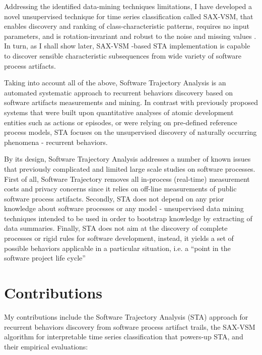 Addressing the identified data-mining techniques limitations, 
I have developed a novel unsupervised technique for time series classification called SAX-VSM, that enables 
discovery and ranking of class-characteristic patterns, requires no input parameters, and is rotation-invariant 
and robust to the noise and missing values \cite{sax-vsm}. 
In turn, as I shall show later, SAX-VSM -based STA implementation is capable to discover sensible characteristic 
subsequences from wide variety of software process artifacts.

Taking into account all of the above, Software Trajectory Analysis is an automated systematic approach to 
recurrent behaviors discovery based on software artifacts measurements and mining. 
In contrast with previously proposed systems that were built upon quantitative analyses of atomic development 
entities such as actions or episodes, or were relying on pre-defined reference process models, 
STA focuses on the unsupervised discovery of naturally occurring phenomena - recurrent behaviors. 

By its design, Software Trajectory Analysis addresses a number of known issues that previously complicated and 
limited large scale studies on software processes.
First of all, Software Trajectory removes all in-process (real-time) measurement costs and privacy concerns since 
it relies on off-line measurements of public software process artifacts. 
Secondly, STA does not depend on any prior knowledge about software processes or any model - unsupervised 
data mining techniques intended to be used in order to bootstrap knowledge by extracting of data summaries. 
Finally, STA does not aim at the discovery of complete processes or rigid rules for software development, instead,
it yields a set of possible behaviors applicable in a particular situation, 
i.e. a ``point in the software project life cycle'' \cite{demillo1980software}


\section{Contributions}\label{section_contributions}
My contributions include the Software Trajectory Analysis (STA) approach for recurrent behaviors discovery
from software process artifact trails, the SAX-VSM algorithm for interpretable time series classification 
that powers-up STA, and their empirical evaluations: 

